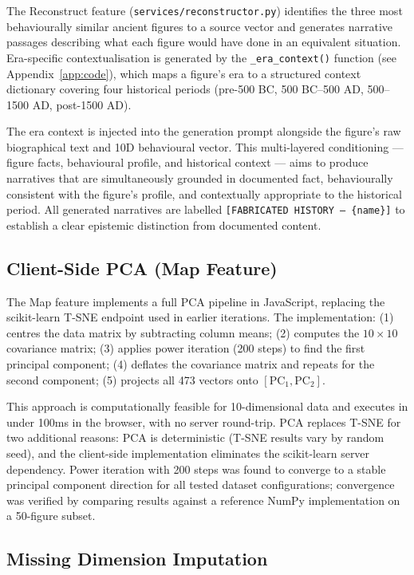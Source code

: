 \documentclass[11pt, a4paper]{report}
\begin{document}
The Reconstruct feature (\texttt{services/reconstructor.py}) identifies the three most behaviourally similar ancient figures to a source vector and generates narrative passages describing what each figure would have done in an equivalent situation. Era-specific contextualisation is generated by the \texttt{\_era\_context()} function (see Appendix~\ref{app:code}), which maps a figure's era to a structured context dictionary covering four historical periods (pre-500 BC, 500 BC--500 AD, 500--1500 AD, post-1500 AD).

The era context is injected into the generation prompt alongside the figure's raw biographical text and 10D behavioural vector. This multi-layered conditioning — figure facts, behavioural profile, and historical context — aims to produce narratives that are simultaneously grounded in documented fact, behaviourally consistent with the figure's profile, and contextually appropriate to the historical period. All generated narratives are labelled \texttt{[FABRICATED HISTORY — \{name\}]} to establish a clear epistemic distinction from documented content.

\subsection{Client-Side PCA (Map Feature)}

The Map feature implements a full PCA pipeline in JavaScript, replacing the scikit-learn T-SNE endpoint used in earlier iterations. The implementation: (1) centres the data matrix by subtracting column means; (2) computes the $10 \times 10$ covariance matrix; (3) applies power iteration (200 steps) to find the first principal component; (4) deflates the covariance matrix and repeats for the second component; (5) projects all 473 vectors onto $[\text{PC}_1, \text{PC}_2]$.

This approach is computationally feasible for 10-dimensional data and executes in under 100ms in the browser, with no server round-trip. PCA replaces T-SNE for two additional reasons: PCA is deterministic (T-SNE results vary by random seed), and the client-side implementation eliminates the scikit-learn server dependency. Power iteration with 200 steps was found to converge to a stable principal component direction for all tested dataset configurations; convergence was verified by comparing results against a reference NumPy implementation on a 50-figure subset.

\subsection{Missing Dimension Imputation}
\end{document}
